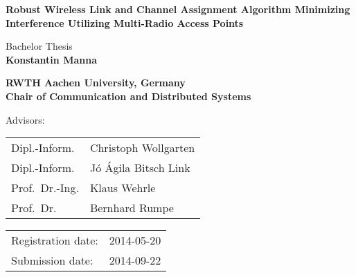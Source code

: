 \titlehead{
	\centering
	\texttt{[image: logos/comsys-text]}
	\hfill
	\texttt{[image: logos/rwth]}
} %

\begin{titlepage}

\let\footnotesize\small \let\footnoterule\relax

\hbox{}
\vfill

\centering

\begin{doublespace}
{ \huge\textbf{\textsf{Robust Wireless Link and Channel Assignment Algorithm
Minimizing Interference Utilizing Multi-Radio Access Points 
}}}
\end{doublespace}
\vskip 2cm

{\large Bachelor Thesis\\[5pt]}
{\large \textbf{Konstantin Manna}}
\vskip 1cm

\textbf{RWTH Aachen University, Germany\\[5pt]
        Chair of Communication and Distributed Systems}
\vskip 2cm

\large

Advisors:
\vskip 2mm

\begin{tabular}{R{7cm}p{7cm}}
Dipl.-Inform. & Christoph Wollgarten\\
Dipl.-Inform. & J\'o \'Agila Bitsch Link\\
Prof.~Dr.-Ing. & Klaus Wehrle\\
Prof.~Dr. & Bernhard Rumpe
\end{tabular}
\vskip 1cm

\begin{tabular}{R{6cm}p{6cm}}
Registration date:  & 2014-05-20 \\
Submission date:    & 2014-09-22 \\
\end{tabular}

\vfill

\end{titlepage}

